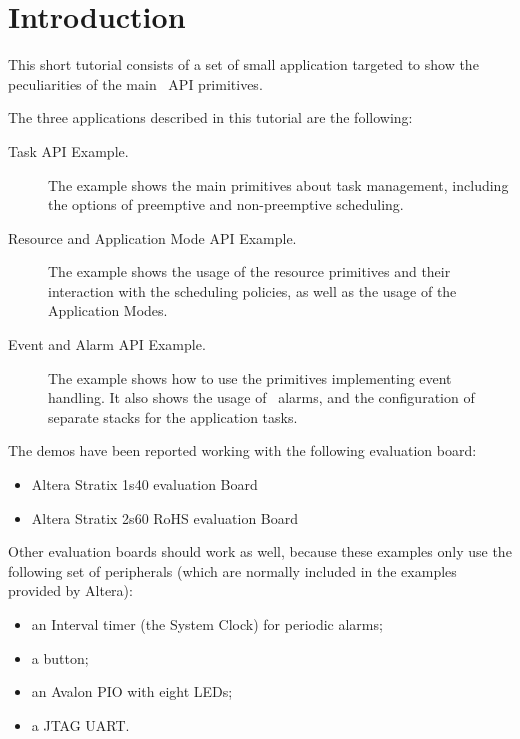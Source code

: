 \chapter{Introduction}

This short tutorial consists of a set of small application targeted to
show the peculiarities of the main \ee\ API primitives.

The three applications described in this tutorial are the following:

\begin{description}
\item [Task API Example.] The example shows the main primitives about
  task management, including the options of preemptive and
  non-preemptive scheduling.

\item [Resource and Application Mode API Example.] The example shows
  the usage of the resource primitives and their interaction with the
  scheduling policies, as well as the usage of the Application Modes.

\item [Event and Alarm API Example.] The example shows how to use the
  primitives implementing event handling. It also shows the usage of
  \ee\ alarms, and the configuration of separate stacks for the
  application tasks.
\end{description}

The demos have been reported working with the following evaluation
board:

\begin{itemize}
\item Altera Stratix 1s40 evaluation Board
\item Altera Stratix 2s60 RoHS evaluation Board
\end{itemize}

Other evaluation boards should work as well, because these examples
only use the following set of peripherals (which are normally included
in the examples provided by Altera):

\begin{itemize}
\item an Interval timer (the  System Clock) for periodic alarms;
\item a button;
\item an Avalon PIO with eight LEDs;
\item a JTAG UART.
\end{itemize}


